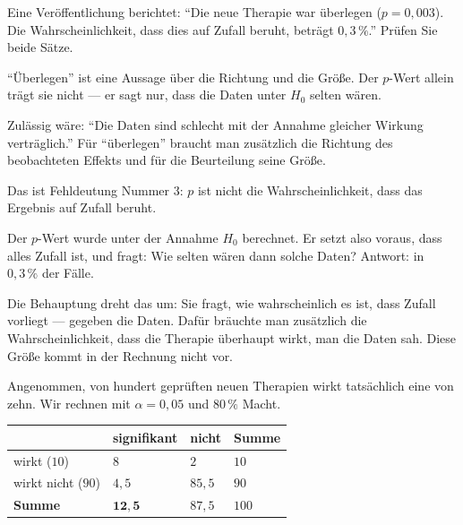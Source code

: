 \begin{aufgabe}
Eine Veröffentlichung berichtet: \enquote{Die neue Therapie war überlegen ($p = 0{,}003$). Die Wahrscheinlichkeit, dass dies auf Zufall beruht, beträgt $0{,}3\,\%$.} Prüfen Sie beide Sätze.

\loesung
{}
\enquote{Überlegen} ist eine Aussage über die Richtung und die Größe. Der $p$-Wert allein trägt sie nicht --- er sagt nur, dass die Daten unter $H_0$ selten wären.

Zulässig wäre: \enquote{Die Daten sind schlecht mit der Annahme gleicher Wirkung verträglich.} Für \enquote{überlegen} braucht man zusätzlich die Richtung des beobachteten Effekts und für die Beurteilung seine Größe.

Das ist Fehldeutung Nummer $3$: $p$ ist nicht die Wahrscheinlichkeit, dass das Ergebnis auf Zufall beruht.

Der $p$-Wert wurde unter der Annahme $H_0$ berechnet. Er setzt also voraus, dass alles Zufall ist, und fragt: Wie selten wären dann solche Daten? Antwort: in $0{,}3\,\%$ der Fälle.

Die Behauptung dreht das um: Sie fragt, wie wahrscheinlich es ist, dass Zufall vorliegt --- gegeben die Daten. Dafür bräuchte man zusätzlich die Wahrscheinlichkeit, dass die Therapie überhaupt wirkt,  man die Daten sah. Diese Größe kommt in der Rechnung nicht vor.

Angenommen, von hundert geprüften neuen Therapien wirkt tatsächlich eine von zehn. Wir rechnen mit $\alpha = 0{,}05$ und $80\,\%$ Macht.

\begin{center}
{\small
\renewcommand{\arraystretch}{1.48}
\begin{tabular}{@{}P{2.6cm}P{2.0cm}P{2.0cm}P{1.6cm}@{}}
\toprule
& \textbf{signifikant} & \textbf{nicht} & \textbf{Summe}\\
\midrule
wirkt ($10$) & $8$ & $2$ & $10$\\
wirkt nicht ($90$) & \textcolor{akzent}{$4{,}5$} & $85{,}5$ & $90$\\
\midrule
\textbf{Summe} & $\mathbf{12{,}5}$ & $87{,}5$ & $100$\\
\bottomrule
\end{tabular}}
\end{center}


\end{aufgabe}
